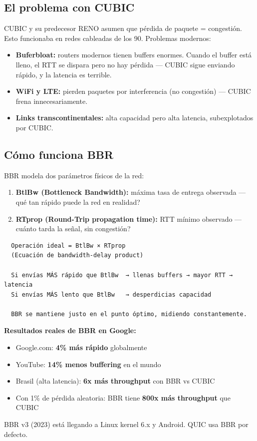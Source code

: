 \subsection{El problema con CUBIC}

CUBIC y su predecesor RENO asumen que pérdida de paquete = congestión.
Esto funcionaba en redes cableadas de los 90. Problemas modernos:

\begin{itemize}
    \item \textbf{Buferbloat:} routers modernos tienen buffers enormes.
          Cuando el buffer está lleno, el RTT se dispara pero no hay pérdida
          --- CUBIC sigue enviando rápido, y la latencia es terrible.
    \item \textbf{WiFi y LTE:} pierden paquetes por interferencia (no congestión)
          --- CUBIC frena innecesariamente.
    \item \textbf{Links transcontinentales:} alta capacidad pero alta latencia,
          subexplotados por CUBIC.
\end{itemize}

\subsection{Cómo funciona BBR}

BBR modela dos parámetros físicos de la red:
\begin{enumerate}
    \item \textbf{BtlBw (Bottleneck Bandwidth):} máxima tasa de entrega observada
          --- qué tan rápido puede la red en realidad?
    \item \textbf{RTprop (Round-Trip propagation time):} RTT mínimo observado
          --- cuánto tarda la señal, sin congestión?
\end{enumerate}

\begin{lstlisting}
  Operación ideal = BtlBw × RTprop
  (Ecuación de bandwidth-delay product)

  Si envías MÁS rápido que BtlBw  → llenas buffers → mayor RTT → latencia
  Si envías MÁS lento que BtlBw   → desperdicias capacidad

  BBR se mantiene justo en el punto óptimo, midiendo constantemente.
\end{lstlisting}

\begin{moderno}
\textbf{ Resultados reales de BBR en Google:}
\begin{itemize}
    \item Google.com: \textbf{4\% más rápido} globalmente
    \item YouTube: \textbf{14\% menos buffering} en el mundo
    \item Brasil (alta latencia): \textbf{6x más throughput} con BBR vs CUBIC
    \item Con 1\% de pérdida aleatoria: BBR tiene \textbf{800x más
          throughput} que CUBIC
\end{itemize}
BBR v3 (2023) está llegando a Linux kernel 6.x y Android.
QUIC usa BBR por defecto.
\end{moderno}

